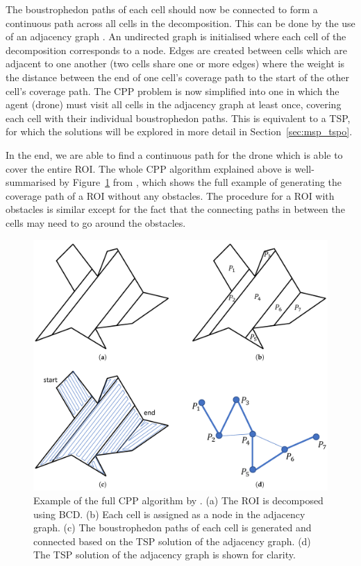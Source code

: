 The boustrophedon paths of each cell should now be connected to form a continuous path across all cells in the decomposition. This can be done by the use of an adjacency graph \cite{choset1998bcd}. An undirected graph is initialised where each cell of the decomposition corresponds to a node. Edges are created between cells which are adjacent to one another (two cells share one or more edges) where the weight is the distance between the end of one cell's coverage path to the start of the other cell's coverage path. The \gls{CPP} problem is now simplified into one in which the agent (drone) must visit all cells in the adjacency graph at least once, covering each cell with their individual boustrophedon paths. This is equivalent to a \gls{TSP}, for which the solutions will be explored in more detail in Section~\ref{sec:msp_tspo}. 

In the end, we are able to find a continuous path for the drone which is able to cover the entire \gls{ROI}. The whole \gls{CPP} algorithm explained above is well-summarised by Figure~\ref{fig:msp_cabreira} from \cite{cabreira2019surveycpp}, which shows the full example of generating the coverage path of a \gls{ROI} without any obstacles. The procedure for a \gls{ROI} with obstacles is similar except for the fact that the connecting paths in between the cells may need to go around the obstacles.  

\begin{figure}[h!]
    \centering
    \includegraphics[width=0.7\linewidth]{figs//Jihwan/cabreira.png}
    \caption[Example of the Full CPP Algorithm]{Example of the full \gls{CPP} algorithm by \cite{cabreira2019surveycpp}. (a) The \gls{ROI} is decomposed using \gls{BCD}. (b) Each cell is assigned as a node in the adjacency graph. (c) The boustrophedon paths of each cell is generated and connected based on the \gls{TSP} solution of the adjacency graph. (d) The \gls{TSP} solution of the adjacency graph is shown for clarity.}
    \label{fig:msp_cabreira}
\end{figure}

